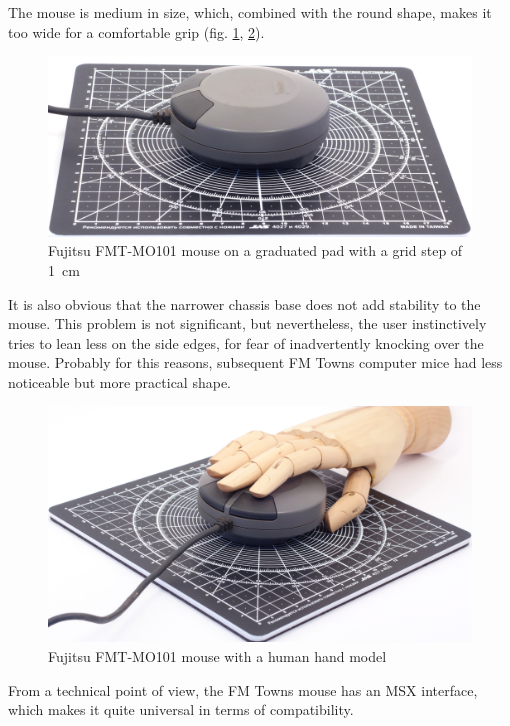 \documentclass[11pt, a4paper]{article}
\begin{document}
The mouse is medium in size, which, combined with the round shape, makes it too wide \cite{twinklemagic} for a comfortable grip (fig. \ref{fig:FMT1Size}, \ref{fig:FMT1Hand}).

\begin{figure}[h]
    \centering
    \includegraphics[scale=0.48]{1989_fujitsu_fmt_mo101_mouse/size_30.jpg}
    \caption{Fujitsu FMT-MO101 mouse on a graduated pad with a grid step of 1~cm}
    \label{fig:FMT1Size}
\end{figure}

It is also obvious that the narrower chassis base does not add stability to the mouse. This problem is not significant, but nevertheless, the user instinctively tries to lean less on the side edges, for fear of inadvertently knocking over the mouse. Probably for this reasons, subsequent FM Towns computer mice had less noticeable but more practical shape.

\begin{figure}[h]
    \centering
    \includegraphics[scale=0.47]{1989_fujitsu_fmt_mo101_mouse/hand_30.jpg}
    \caption{Fujitsu FMT-MO101 mouse with a human hand model}
    \label{fig:FMT1Hand}
\end{figure}

From a technical point of view, the FM Towns mouse has an MSX interface, which makes it quite universal in terms of \cite{tepatti} compatibility.
\end{document}
